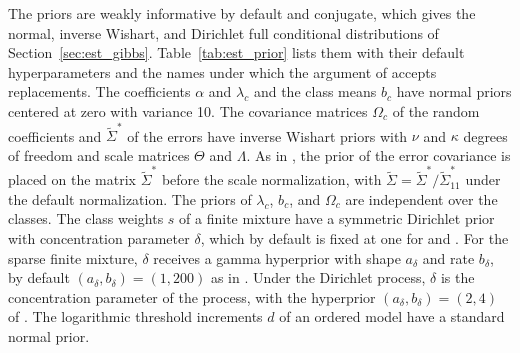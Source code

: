 \documentclass[article,shortnames]{jss}
\newcommand{\fct}[1]{\code{#1()}}
\begin{document}
The priors are weakly informative by default and conjugate, which gives the
normal, inverse Wishart, and Dirichlet full conditional distributions of
Section~\ref{sec:est_gibbs}. Table~\ref{tab:est_prior} lists them with their
default hyperparameters and the names under which the argument  of
\fct{fit} accepts replacements. The coefficients $\alpha$ and $\lambda_c$ and
the class means $b_c$ have normal priors centered at zero with variance 10. The
covariance matrices $\Omega_c$ of the random coefficients and
$\tilde{\Sigma}^\ast$ of the errors have inverse Wishart priors with $\nu$ and
$\kappa$ degrees of freedom and scale matrices $\Theta$ and $\Lambda$. As in
\citet{Imai2005a}, the prior of the error covariance is placed on the matrix
$\tilde{\Sigma}^\ast$ before the scale normalization, with $\tilde{\Sigma} =
\tilde{\Sigma}^\ast / \tilde{\Sigma}^\ast_{11}$ under the default normalization.
The priors of $\lambda_c$, $b_c$, and $\Omega_c$ are independent over the
classes. The class weights $s$ of a finite mixture have a symmetric Dirichlet
prior with concentration parameter $\delta$, which by default is fixed at one
for  and . For the sparse
finite mixture, $\delta$ receives a gamma hyperprior with shape $a_\delta$ and
rate $b_\delta$, by default $(a_\delta, b_\delta) = (1, 200)$ as in
\citet{FruehwirthSchnatter2019}. Under the Dirichlet process, $\delta$ is the
concentration parameter of the process, with the hyperprior $(a_\delta,
b_\delta) = (2, 4)$ of \citet{Escobar1995}. The logarithmic threshold increments
$d$ of an ordered model have a standard normal prior.
\end{document}
